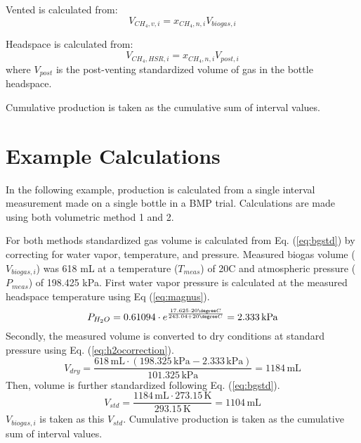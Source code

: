 \documentclass[]{article}
\newcommand{\unit}[1]{\ensuremath{\, \mathrm{#1}}}
\begin{document}
Vented  is calculated from:
\begin{equation}
  V_{CH_4, v, i} = x_{CH_4, n, i} V_{biogas, i}
\end{equation}

Headspace  is calculated from:
\begin{equation}
  V_{CH_4, HSR, i} = x_{CH_4, n, i} V_{post, i}
\end{equation}
where $V_{post}$ is the post-venting standardized volume of gas in the bottle headspace.

Cumulative production is taken as the cumulative sum of interval values. 

\section{Example Calculations}
In the following example,  production is calculated from a single interval measurement made on a single bottle in a BMP trial. Calculations are made using both volumetric method 1 and 2. 

For both methods standardized gas volume is calculated from Eq. (\ref{eq:bgstd}) by correcting for water vapor, temperature, and pressure. Measured biogas volume ($V_{biogas,i}$) was 618 mL at a temperature ($T_{meas}$) of 20\degree C and atmospheric pressure ($P_{meas}$) of 198.425 kPa.  
First water vapor pressure is calculated at the measured headspace temperature using Eq (\ref{eq:magnus}).
\begin{equation*}
   P_{H_2O} = 0.61094 \cdot e^{\frac{17.625 \cdot 20\degree C}{243.04 + 20\degree C}} = 2.333\unit{kPa}
\end{equation*}
Secondly, the measured volume is converted to dry conditions at standard pressure using Eq. (\ref{eq:h2ocorrection}).
\begin{equation*}
   V_{dry} = \frac{618\unit{mL} \cdot (198.325\unit{kPa} - 2.333\unit{kPa})}{101.325\unit{kPa}} = 1184\unit{mL}  
\end{equation*}
Then, volume is further standardized following Eq. (\ref{eq:bgstd}).
\begin{equation*}
    V_{std} = \frac{1184\unit{mL} \cdot 273.15\unit{K}}{293.15\unit{K}} = 1104\unit{mL}  
\end{equation*}
$V_{biogas,i}$ is taken as this $V_{std}$. Cumulative production is taken as the cumulative sum of interval values.
\end{document}
